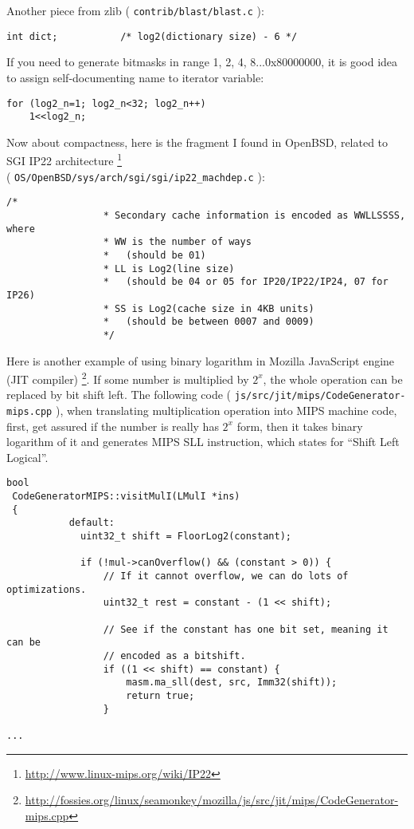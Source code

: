 Another piece from zlib ( \texttt{contrib/blast/blast.c} ):

\begin{lstlisting}[caption=C code]
    int dict;           /* log2(dictionary size) - 6 */
\end{lstlisting}

If you need to generate bitmasks in range 1, 2, 4, 8...0x80000000, it is good idea to assign self-documenting name to iterator variable:

\begin{lstlisting}[caption=C code]
for (log2_n=1; log2_n<32; log2_n++)
    1<<log2_n;
\end{lstlisting}

Now about compactness, here is the fragment I found in OpenBSD, related to SGI IP22 architecture
\footnote{\url{http://www.linux-mips.org/wiki/IP22}} \\
( \texttt{OS/OpenBSD/sys/arch/sgi/sgi/ip22\_machdep.c} ):

\begin{lstlisting}[caption=C code]
                /*
                 * Secondary cache information is encoded as WWLLSSSS, where
                 * WW is the number of ways
                 *   (should be 01)
                 * LL is Log2(line size)
                 *   (should be 04 or 05 for IP20/IP22/IP24, 07 for IP26)
                 * SS is Log2(cache size in 4KB units)
                 *   (should be between 0007 and 0009)
                 */
\end{lstlisting}

Here is another example of using binary logarithm in Mozilla JavaScript engine (JIT compiler)
\footnote{\url{http://fossies.org/linux/seamonkey/mozilla/js/src/jit/mips/CodeGenerator-mips.cpp}}.
If some number is multiplied by $2^x$, the whole operation can be replaced by bit shift left.
The following code ( \texttt{js/src/jit/mips/CodeGenerator-mips.cpp} ), 
when translating multiplication operation into MIPS machine code, first, get assured if the number 
is really has $2^x$ form, then it takes binary logarithm of it and generates MIPS SLL instruction, which states for ``Shift Left Logical''.

\begin{lstlisting}[caption=Mozilla JavaScript JIT compiler (translating multiplication operation into MIPS bit shift instruction)]
bool
 CodeGeneratorMIPS::visitMulI(LMulI *ins)
 {
           default:
             uint32_t shift = FloorLog2(constant);
 
             if (!mul->canOverflow() && (constant > 0)) {
                 // If it cannot overflow, we can do lots of optimizations.
                 uint32_t rest = constant - (1 << shift);
 
                 // See if the constant has one bit set, meaning it can be
                 // encoded as a bitshift.
                 if ((1 << shift) == constant) {
                     masm.ma_sll(dest, src, Imm32(shift));
                     return true;
                 }

...

\end{lstlisting}

